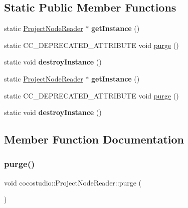 \subsection*{Static Public Member Functions}
\begin{DoxyCompactItemize}
\item 
\mbox{\label{classcocostudio_1_1ProjectNodeReader_a17c646a3b1351fe98e0d9334b05d0b82}} 
static \hyperlink{classcocostudio_1_1ProjectNodeReader}{Project\+Node\+Reader} $\ast$ {\bfseries get\+Instance} ()
\item 
static C\+C\+\_\+\+D\+E\+P\+R\+E\+C\+A\+T\+E\+D\+\_\+\+A\+T\+T\+R\+I\+B\+U\+TE void \hyperlink{classcocostudio_1_1ProjectNodeReader_a4cf57b30999c537be58cbe81ed808729}{purge} ()
\item 
\mbox{\label{classcocostudio_1_1ProjectNodeReader_a8caa6f6c753b91b7dcf939881c984f1c}} 
static void {\bfseries destroy\+Instance} ()
\item 
\mbox{\label{classcocostudio_1_1ProjectNodeReader_ae21aafee2cccd6bbc03d2357e1b7ae1e}} 
static \hyperlink{classcocostudio_1_1ProjectNodeReader}{Project\+Node\+Reader} $\ast$ {\bfseries get\+Instance} ()
\item 
static C\+C\+\_\+\+D\+E\+P\+R\+E\+C\+A\+T\+E\+D\+\_\+\+A\+T\+T\+R\+I\+B\+U\+TE void \hyperlink{classcocostudio_1_1ProjectNodeReader_a34ea8d5fa45e143a79682fbd1f17ed41}{purge} ()
\item 
\mbox{\label{classcocostudio_1_1ProjectNodeReader_ab7570d8eb5371889996f93e1830443fa}} 
static void {\bfseries destroy\+Instance} ()
\end{DoxyCompactItemize}


\subsection{Member Function Documentation}
\mbox{\label{classcocostudio_1_1ProjectNodeReader_a4cf57b30999c537be58cbe81ed808729}} 
\subsubsection{\texorpdfstring{purge()}{purge()}\hspace{0.1cm}{\footnotesize\ttfamily [1/2]}}
{\footnotesize\ttfamily void cocostudio\+::\+Project\+Node\+Reader\+::purge (\begin{DoxyParamCaption}{ }\end{DoxyParamCaption})\hspace{0.3cm}{\ttfamily [static]}}

